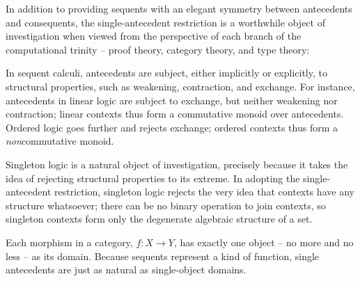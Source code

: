 In addition to providing sequents with an elegant symmetry between antecedents and consequents, the single-antecedent restriction is a worthwhile object of investigation when viewed from the perspective of each branch of the computational trinity\autocite{Harper:??} -- proof theory, category theory, and type theory:
%
\begin{description}[parsep=0pt, listparindent=\parindent]
\item[Proof theory]
  In sequent calculi, antecedents are subject, either implicitly or explicitly, to structural properties, such as weakening, contraction, and exchange.
  For instance, antecedents in linear logic are subject to exchange, but neither weakening nor contraction; linear contexts thus form a commutative monoid over antecedents.
  Ordered logic goes further and rejects exchange; ordered contexts thus form a \emph{non}\-commutative monoid.


  Singleton logic is a natural object of investigation, precisely because it takes the idea of rejecting structural properties to its extreme.
  In adopting the single-antecedent restriction, singleton logic rejects the very idea that contexts have any structure whatsoever; there can be no binary operation to join contexts, so singleton contexts form only the degenerate algebraic structure of a set.

\item[Category theory]
  Each morphism in a category, $f\colon X \rightarrow Y$, has exactly one object -- no more and no less -- as its domain.
  Because sequents represent a kind of function, single antecedents are just as natural as single-object domains.


\end{description}
